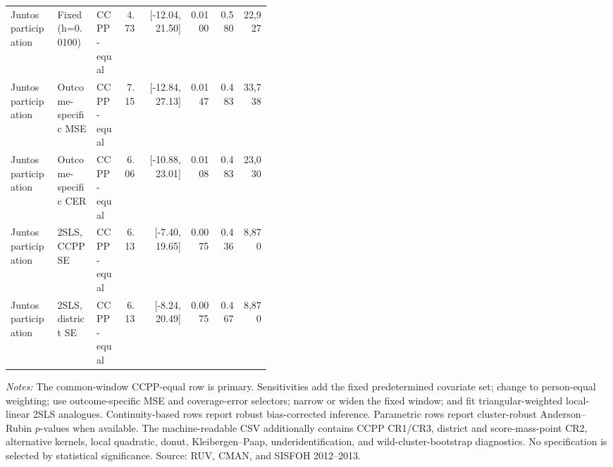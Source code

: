 \begin{longtable}{p{0.18\linewidth}p{0.15\linewidth}p{0.10\linewidth}rrrrr}
Juntos participation & Fixed (h=0.0100) & CCPP-equal & 4.73 & [-12.04, 21.50] & 0.0100 & 0.580 & 22,927 \\
Juntos participation & Outcome-specific MSE & CCPP-equal & 7.15 & [-12.84, 27.13] & 0.0147 & 0.483 & 33,738 \\
Juntos participation & Outcome-specific CER & CCPP-equal & 6.06 & [-10.88, 23.01] & 0.0108 & 0.483 & 23,030 \\
Juntos participation & 2SLS, CCPP SE & CCPP-equal & 6.13 & [-7.40, 19.65] & 0.0075 & 0.436 & 8,870 \\
Juntos participation & 2SLS, district SE & CCPP-equal & 6.13 & [-8.24, 20.49] & 0.0075 & 0.467 & 8,870 \\
\bottomrule
\end{longtable}
\begin{minipage}{0.98\linewidth}\footnotesize\textit{Notes:} The common-window CCPP-equal row is primary. Sensitivities add the fixed predetermined covariate set; change to person-equal weighting; use outcome-specific MSE and coverage-error selectors; narrow or widen the fixed window; and fit triangular-weighted local-linear 2SLS analogues. Continuity-based rows report robust bias-corrected inference. Parametric rows report cluster-robust Anderson--Rubin \(p\)-values when available. The machine-readable CSV additionally contains CCPP CR1/CR3, district and score-mass-point CR2, alternative kernels, local quadratic, donut, Kleibergen--Paap, underidentification, and wild-cluster-bootstrap diagnostics. No specification is selected by statistical significance. Source: RUV, CMAN, and SISFOH 2012--2013.\end{minipage}
\endgroup
